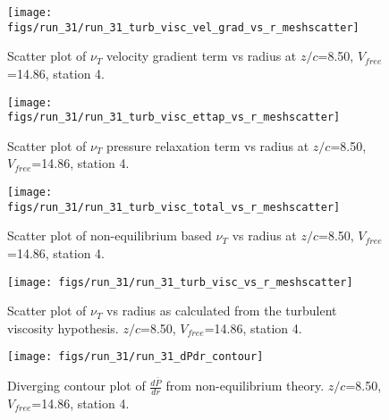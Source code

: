 \begin{figure}[H]
\centering
\texttt{[image: figs/run\_31/run\_31\_turb\_visc\_vel\_grad\_vs\_r\_meshscatter]}
\caption{Scatter plot of $\nu_T$ velocity gradient term vs radius at $z/c$=8.50, $V_{free}$=14.86, station 4.}
\end{figure}


\begin{figure}[H]
\centering
\texttt{[image: figs/run\_31/run\_31\_turb\_visc\_ettap\_vs\_r\_meshscatter]}
\caption{Scatter plot of $\nu_T$ pressure relaxation term vs radius at $z/c$=8.50, $V_{free}$=14.86, station 4.}
\end{figure}


\begin{figure}[H]
\centering
\texttt{[image: figs/run\_31/run\_31\_turb\_visc\_total\_vs\_r\_meshscatter]}
\caption{Scatter plot of non-equilibrium based $\nu_T$ vs radius at $z/c$=8.50, $V_{free}$=14.86, station 4.}
\end{figure}


\begin{figure}[H]
\centering
\texttt{[image: figs/run\_31/run\_31\_turb\_visc\_vs\_r\_meshscatter]}
\caption{Scatter plot of $\nu_T$ vs radius as calculated from the turbulent viscosity hypothesis. $z/c$=8.50, $V_{free}$=14.86, station 4.}
\end{figure}


\begin{figure}[H]
\centering
\texttt{[image: figs/run\_31/run\_31\_dPdr\_contour]}
\caption{Diverging contour plot of $\frac{d\bar{P}}{dr}$ from non-equilibrium theory. $z/c$=8.50, $V_{free}$=14.86, station 4.}
\end{figure}


